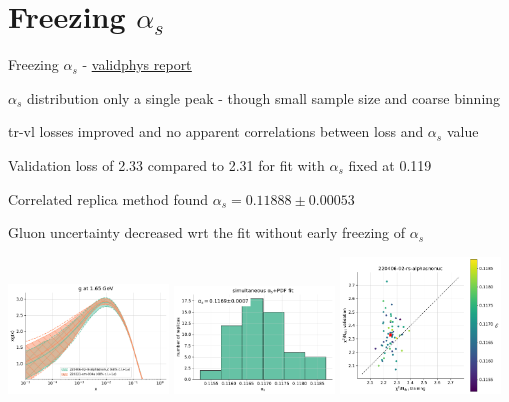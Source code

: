 \documentclass[aspectratio=169,10pt]{beamer}
\begin{document}
\section*{Freezing $\alpha_s$}

\begin{frame}[t]{Freezing $\alpha_s$ - \underline{\href{https://vp.nnpdf.science/J-wRSP3IRxeAMYoImWktBQ==/}{validphys report}}}

  $\alpha_s$ distribution only a single peak - though small sample size and coarse binning\\\vspace*{0.5em}
  
  tr-vl losses improved and no apparent correlations between loss and $\alpha_s$ value\\\vspace*{0.5em}

  Validation loss of 2.33 compared to 2.31 for fit with $\alpha_s$ fixed at 0.119\\\vspace*{0.5em}

  Correlated replica method found $\alpha_s= 0.11888 \pm 0.00053$\\\vspace*{0.5em}

  Gluon uncertainty decreased wrt the fit without early freezing of $\alpha_s$

  \vspace*{-8mm}
  \includegraphics[width=0.32\textwidth]{PDFnormalize0_Basespecs0_PDFscalespecs0_plot_pdfs_g_frac75.pdf}  
  \includegraphics[width=0.32\textwidth]{alphas_hist_frac75.pdf}
  \includegraphics[width=0.32\textwidth]{plot_training_validation_frac75.pdf}

\end{frame}
\end{document}
